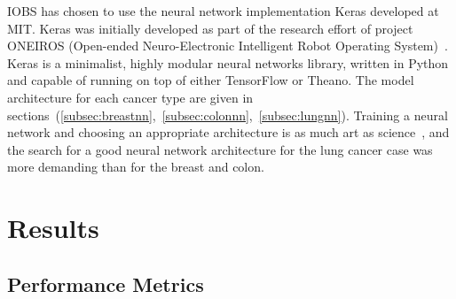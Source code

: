 \documentclass[a4paper,11pt]{article}
\begin{document}
IOBS has chosen to use the neural network implementation Keras developed at MIT.
Keras was initially developed as part of the research effort of project ONEIROS (Open-ended Neuro-Electronic Intelligent Robot Operating System)~\cite{keras}.
Keras is a minimalist, highly modular neural networks library, written in Python and capable of running on top of either TensorFlow or Theano. The model architecture for each cancer type are given in sections~(\ref{subsec:breastnn},~\ref{subsec:colonnn},~\ref{subsec:lungnn}). Training a neural network and choosing an appropriate architecture is as much art as science~\cite{deeplearning}, and the search for a good neural network architecture for the lung cancer case was more demanding than for the breast and colon. 




















\section{Results}
\label{sec:results}



\subsection{Performance Metrics}
\label{sec:performancemetrics}

\end{document}
